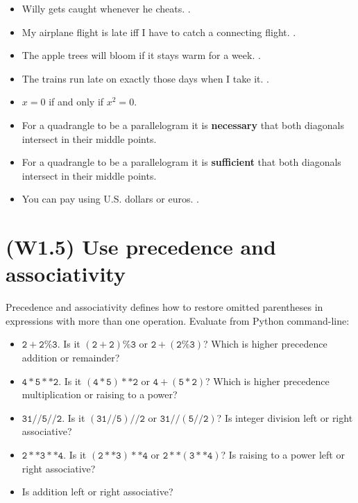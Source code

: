 \documentclass[jou]{apa6}
\begin{document}
\begin{itemize}
\item Willy gets caught whenever he cheats.
\parencite[see][p.15, Ex24.d]{Rosen2019}.
\item My airplane flight is late iff I have to catch a connecting flight.
\parencite[see][p.16, Ex28.e]{Rosen2019}.
\item The apple trees will bloom if it stays warm for a week. 
\parencite[see][p.15, Ex25.b]{Rosen2019}.
\item The trains run late on exactly those days when I take it.
\parencite[see][p.15, Ex27.e]{Rosen2019}.
\item $x=0$ if and only if $x^2 = 0$.
\item For a quadrangle to be a parallelogram it is {\bf necessary} that
both diagonals intersect in their middle points. 
\item For a quadrangle to be a parallelogram it is {\bf sufficient} that
both diagonals intersect in their middle points. 
\item You can pay using U.S. dollars or euros.
\parencite[see][p.15, Ex27.e]{Rosen2019}.
\end{itemize}

\section{(W1.5) Use precedence and associativity}

Precedence and associativity defines how to restore omitted parentheses
in expressions with more than one operation.
Evaluate from Python command-line:

\begin{itemize}
\item $\mathtt{2+2\%3}$. Is it $\mathtt{(2+2)\%3}$ or $\mathtt{2+(2\%3)}$? 
Which is higher precedence \textendash{} addition or remainder?
\item $\mathtt{4*5**2}$. Is it $\mathtt{(4*5)**2}$ or $\mathtt{4+(5*2)}$? 
Which is higher precedence \textendash{} multiplication or raising to a power?
\item $\mathtt{31//5//2}$.  Is it $\mathtt{(31//5)//2}$ or $\mathtt{31//(5//2)}$? 
Is integer division left or right associative?
\item $\mathtt{2**3**4}$.  Is it $\mathtt{(2**3)**4}$ or $\mathtt{2**(3**4)}$? 
Is raising to a power left or right associative?
\item Is addition left or right associative?
\end{itemize}
\end{document}
